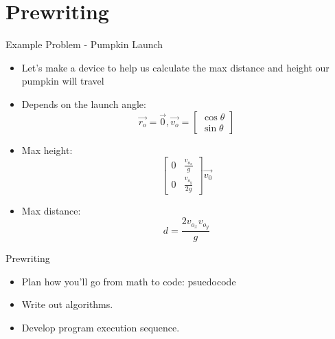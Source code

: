 \documentclass[main.tex]{subfiles}
\begin{document}
\section{Prewriting} 
\label{sec:prewriting}

\begin{frame}[fragile]{Example Problem - Pumpkin Launch}
	\begin{itemize}
		\item Let's make a device to help us calculate the max distance and height
				our pumpkin will travel
		\item Depends on the launch angle: 
			\[ 
				\vec{r_o} = \vec{0} , 
				\vec{v_{o}} = 
					\begin{bmatrix} \cos{\theta} \\ \sin{\theta} \end{bmatrix} 
			\]
		\item Max height: 
			\[
				\begin{bmatrix}
					   0 & \frac{v_{o_{x}}}{g}
					\\ 0 & \frac{v_{o_{y}}}{2 g}
				\end{bmatrix}\vec{v_0}
			\]
		\item Max distance: \[d = \frac{2 v_{o_{x}} v_{o_{y}}}{g}\]
	\end{itemize}
	
\end{frame}

\begin{frame}{Prewriting}
	\begin{itemize}
		\item Plan how you'll go from math to code: psuedocode
		\item Write out algorithms.
		\item Develop program execution sequence.
	\end{itemize}
\end{frame}


\end{document}

